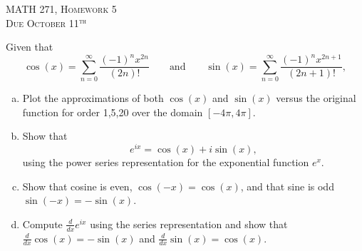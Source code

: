 \documentclass[12pt]{article} %
\begin{document}
\begin{center}
   \textsc{\large MATH 271, Homework 5}\\
   \textsc{Due October 11$^\textrm{th}$}
\end{center}
\vspace{.5cm}


\begin{problem}
	Given that
	\[
	\cos(x) = \sum_{n=0}^\infty \frac{(-1)^n x^{2n}}{(2n)!} \qquad \textrm{and} \qquad \sin(x) = \sum_{n=0}^\infty \frac{(-1)^n x^{2n+1}}{(2n+1)!},
	\]
	\begin{enumerate}[(a)]
		\item Plot the approximations of both $\cos(x)$ and $\sin(x)$ versus the original function for order 1,5,20 over the domain $[-4\pi,4\pi]$.
\item Show that
\[
e^{ix} = \cos(x) + i \sin(x),
\]
using the power series representation for the exponential function $e^x$.
\item Show that cosine is even, $\cos(-x)=\cos(x)$, and that sine is odd $\sin(-x)=-\sin(x)$.
\item Compute $\frac{d}{dx} e^{ix}$ using the series representation and show that $\frac{d}{dx}\cos(x)=-\sin(x)$ and $\frac{d}{dx}\sin(x)=\cos(x)$. 
	\end{enumerate}

\end{problem}

\end{document}
